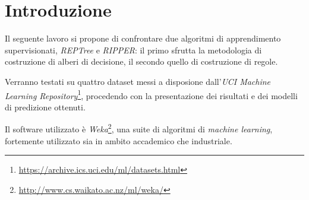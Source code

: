 \chapter{Introduzione}

Il seguente lavoro si propone di confrontare due algoritmi di apprendimento supervisionati, \emph{REPTree} e \emph{RIPPER}: il primo sfrutta la metodologia di costruzione di alberi di decisione, il secondo quello di costruzione di regole.

Verranno testati su quattro dataset messi a disposione dall'\emph{UCI Machine Learning Repository}\footnote{\url{https://archive.ics.uci.edu/ml/datasets.html}}, procedendo con la presentazione dei risultati e dei modelli di predizione ottenuti.

Il software utilizzato è \emph{Weka}\footnote{\url{http://www.cs.waikato.ac.nz/ml/weka/}}, una suite di algoritmi di \textit{machine learning}, fortemente utilizzato sia in ambito accademico che industriale.